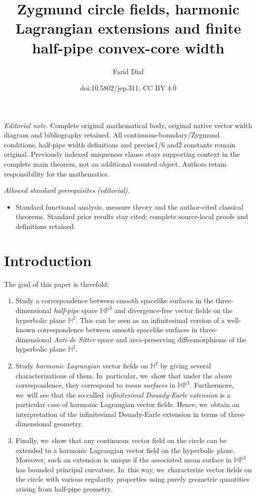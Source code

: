 \documentclass[10pt]{amsart}
\title{Zygmund circle fields, harmonic Lagrangian extensions and finite half-pipe convex-core width}
\author{Farid Diaf}
\date{doi:10.5802/jep.311; CC BY 4.0}
\theoremstyle{plain}
\theoremstyle{definition}
\newcommand{\HP}{\mathbb{HP}^3}
\providecommand{\mainmatter}{}\providecommand{\backmatter}{}
\begin{document}
\maketitle
\noindent\textit{Editorial note.} Complete original mathematical body, original native vector width diagram and bibliography retained. All continuous-boundary/Zygmund conditions, half-pipe width definitions and precise1/6 and2 constants remain original. Previously indexed uniqueness clause stays supporting context in the complete main theorem, not an additional counted object. Authors retain responsibility for the mathematics.\par\medskip
\noindent\textit{Allowed standard prerequisites (editorial).}\begin{itemize}
\item Standard functional analysis, measure theory and the author-cited classical theorems. Standard prior results stay cited; complete source-local proofs and definitions retained.
\end{itemize}\medskip
\vspace*{-\baselineskip}
\tableofcontents

\mainmatter
\section{Introduction}
The goal of this paper is threefold:
\begin{enumerate}
\item Study a correspondence between smooth spacelike surfaces in the three-dimensional \emph{half-pipe} space $\HP$ and divergence-free vector fields on the hyperbolic plane $\mathbb{H}^2$. This can be seen as an infinitesimal version of a well-known correspondence between smooth spacelike surfaces in three-dimensional \emph{Anti-de Sitter} space and area-preserving diffeomorphisms of the hyperbolic plane $\mathbb{H}^2$.
\item Study \emph{harmonic Lagrangian} vector fields on $\mathbb{H}^2$ by giving several characterizations of them. In~particular, we~show that under the above correspondence, they correspond to \emph{mean surfaces} in $\HP$. Furthermore, we~will see that the so-called \emph{infinitesimal Douady-Earle extension} is a particular case of harmonic Lagrangian vector fields. Hence, we~obtain an interpretation of the infinitesimal Douady-Earle extension in terms of three-dimensional geometry.
\item Finally, we~show that any continuous vector field on the circle can be extended to a harmonic Lagrangian vector field on the hyperbolic plane. Moreover, such an extension is unique if the associated mean surface in \(\HP\) has bounded principal curvature. In~this way, we~characterize vector fields on the circle with various regularity properties using purely geometric quantities arising from half-pipe geometry.
\end{enumerate}
\end{document}
